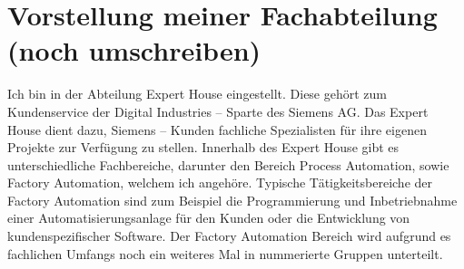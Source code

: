 \chapter{Vorstellung meiner Fachabteilung (noch umschreiben)}\label{ch:data}

\label{sec:Vorstellung meiner Fachabteilung (noch umschreiben)}

Ich bin in der Abteilung Expert House eingestellt. Diese gehört zum Kundenservice
der Digital Industries – Sparte des Siemens AG. Das Expert House dient dazu,
Siemens – Kunden fachliche Spezialisten für ihre eigenen Projekte zur Verfügung
zu stellen. Innerhalb des Expert House gibt es unterschiedliche Fachbereiche, darunter den Bereich Process Automation, sowie Factory Automation, 
welchem ich angehöre. Typische Tätigkeitsbereiche der Factory Automation sind zum Beispiel die
Programmierung und Inbetriebnahme einer Automatisierungsanlage für den
Kunden oder die Entwicklung von kundenspezifischer Software. Der Factory
Automation Bereich wird aufgrund es fachlichen Umfangs noch ein weiteres Mal in
nummerierte Gruppen unterteilt. 

